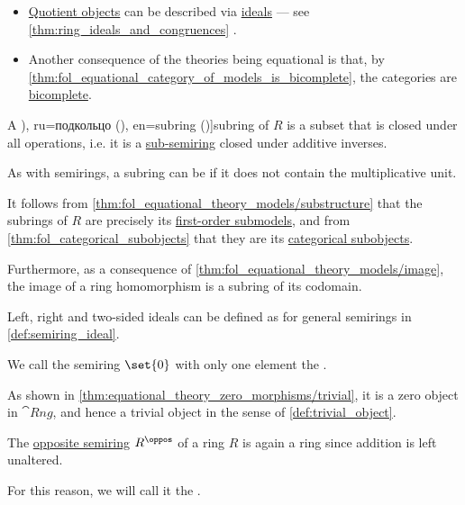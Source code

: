 \begin{definition}
\begin{thmenum}
\begin{itemize}
      \item \hyperref[def:categorical_quotient_object]{Quotient objects} can be described via \hyperref[def:ring/ideal]{ideals} --- see \cref{thm:ring_ideals_and_congruences} .

      \item Another consequence of the theories being equational is that, by \cref{thm:fol_equational_category_of_models_is_bicomplete}, the categories are \hyperref[def:bicomplete_category]{bicomplete}.
    \end{itemize}

    \mimprovised A \term[bg=подпръстен (\cite[def. V.3]{ГеновМиховскиМоллов1991Алгебра}), ru=подкольцо (\cite[def. 1.3.3]{Винберг2014КурсАлгебры}), en=subring (\cite[87]{Jacobson1985BasicAlgebraI})]{subring} of \( R \) is a subset that is closed under all operations, i.e. it is a \hyperref[def:semiring/subobject]{sub-semiring} closed under additive inverses.

    As with semirings, a subring can be  if it does not contain the multiplicative unit.

    It follows from \cref{thm:fol_equational_theory_models/substructure} that the subrings of \( R \) are precisely its \hyperref[def:fol_substructure/submodel]{first-order submodels}, and from \cref{thm:fol_categorical_subobjects} that they are its \hyperref[def:categorical_subobject]{categorical subobjects}.

    Furthermore, as a consequence of \cref{thm:fol_equational_theory_models/image}, the image of a ring homomorphism is a subring of its codomain.

     Left, right and two-sided ideals can be defined as for general semirings in \cref{def:semiring_ideal}.

     We call the semiring \( \set{ 0 } \) with only one element the .

    As shown in \cref{thm:equational_theory_zero_morphisms/trivial}, it is a zero object in \( \cat{Rng} \), and hence a trivial object in the sense of \cref{def:trivial_object}.

     The \hyperref[def:semiring/opposite]{opposite semiring} \( R^\oppos \) of a ring \( R \) is again a ring since addition is left unaltered.

    For this reason, we will call it the .


\end{thmenum}
\end{definition}
